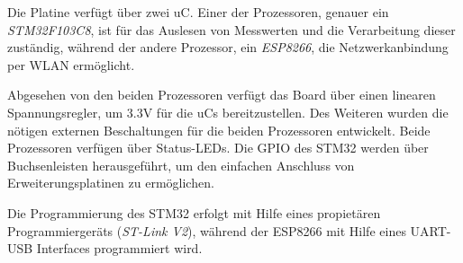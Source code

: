 \smallskip


Die Platine verfügt über zwei \ac{uC}. Einer der Prozessoren, genauer ein \textit{STM32F103C8}, ist für das Auslesen von Messwerten und die
Verarbeitung dieser zuständig, während der andere Prozessor, ein \textit{ESP8266}, die Netzwerkanbindung per \acs{WLAN} ermöglicht.

\smallskip

Abgesehen von den beiden Prozessoren verfügt das Board über einen linearen Spannungsregler, um 3.3V für die \acp{uC} bereitzustellen. Des Weiteren
wurden die nötigen externen Beschaltungen für die beiden Prozessoren entwickelt. Beide Prozessoren verfügen über Status-LEDs. 
Die \acs{GPIO} des STM32 werden über Buchsenleisten herausgeführt, um den einfachen Anschluss von Erweiterungsplatinen zu ermöglichen.

\smallskip

Die Programmierung des STM32 erfolgt mit Hilfe eines propietären Programmiergeräts (\textit{ST-Link V2}), während der ESP8266 mit Hilfe eines
\acs{UART}-USB Interfaces programmiert wird. 
